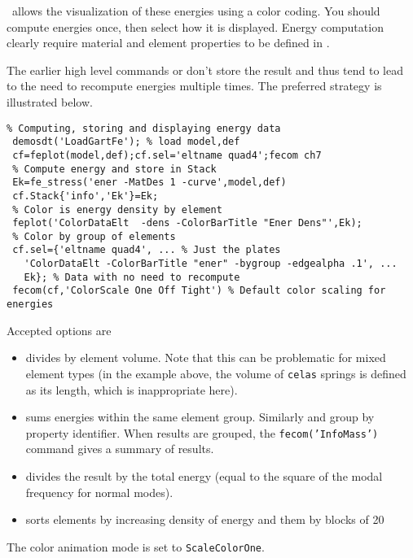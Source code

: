 \begin{SDT}

\feplot\ allows the visualization of these energies using a color coding. You should compute energies once, then select how it is displayed. Energy computation clearly require material and element properties to be defined in .

The earlier high level commands  or  don't store the result and thus tend to lead to the need to recompute energies multiple times. The preferred strategy is illustrated below.

\begin{verbatim}
% Computing, storing and displaying energy data
 demosdt('LoadGartFe'); % load model,def 
 cf=feplot(model,def);cf.sel='eltname quad4';fecom ch7
 % Compute energy and store in Stack
 Ek=fe_stress('ener -MatDes 1 -curve',model,def)
 cf.Stack{'info','Ek'}=Ek;
 % Color is energy density by element
 feplot('ColorDataElt  -dens -ColorBarTitle "Ener Dens"',Ek);
 % Color by group of elements
 cf.sel={'eltname quad4', ... % Just the plates
   'ColorDataElt -ColorBarTitle "ener" -bygroup -edgealpha .1', ...
   Ek}; % Data with no need to recompute
 fecom(cf,'ColorScale One Off Tight') % Default color scaling for energies
\end{verbatim}

Accepted  options are

\begin{itemize}
\item {} divides by element volume. Note that this can be problematic for mixed element types (in the example above, the volume of  {\tt celas} springs is defined as its length, which is inappropriate here).
\item {} sums energies within the same element group. Similarly  and  group by property identifier. When results are grouped, the {\tt fecom('InfoMass')} command gives a summary of results.
\item {} divides the result by the total energy (equal to the square of the modal frequency for normal modes).
\item {} sorts elements by increasing density of energy and them by blocks of 20%

\end{itemize}

The color animation mode is set to {\tt ScaleColorOne}.  

\end{SDT}


